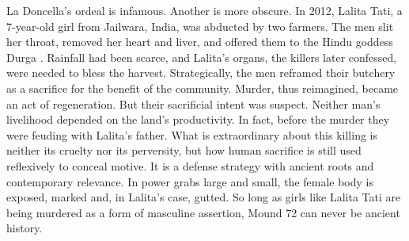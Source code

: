 La Doncella's ordeal is infamous. Another is more obscure. In 2012, Lalita Tati, a 7-year-old girl from Jailwara, India, was abducted by two farmers. The men slit her throat, removed her heart and liver, and offered them to the Hindu goddess Durga \parencite{richards2012}. Rainfall had been scarce, and Lalita's organs, the killers later confessed, were needed to bless the harvest. Strategically, the men reframed their butchery as a sacrifice for the benefit of the community. Murder, thus reimagined, became an act of regeneration. But their sacrificial intent was suspect. Neither man's livelihood depended on the land's productivity. In fact, before the murder they were feuding with Lalita's father. What is extraordinary about this killing is neither its cruelty nor its perversity, but how human sacrifice is still used reflexively to conceal motive. It is a defense strategy with ancient roots and contemporary relevance. In power grabs large and small, the female body is exposed, marked and, in Lalita's case, gutted. So long as girls like Lalita Tati are being murdered as a form of masculine assertion, Mound 72 can never be ancient history. 

